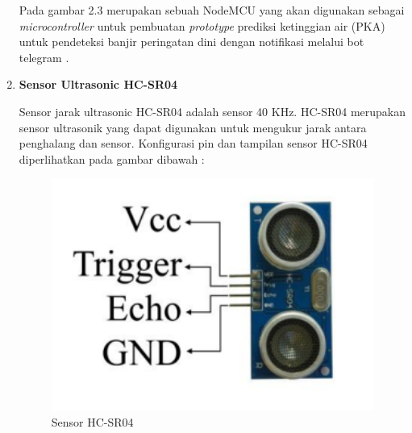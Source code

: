 \begin{enumerate}
\par Pada gambar 2.3 merupakan sebuah NodeMCU yang akan digunakan sebagai \textit{microcontroller} untuk pembuatan \textit{prototype} prediksi ketinggian air (PKA) untuk pendeteksi banjir peringatan dini dengan notifikasi melalui bot telegram .
    
\item \textbf{Sensor Ultrasonic HC-SR04}
\par Sensor jarak ultrasonic HC-SR04 adalah sensor 40 KHz. HC-SR04 merupakan sensor ultrasonik yang dapat digunakan untuk mengukur jarak antara penghalang dan sensor. Konfigurasi pin dan tampilan sensor HC-SR04 diperlihatkan pada gambar dibawah :
\begin{figure}[H]
\centering
\includegraphics[width=1\textwidth]{figures/sensor2.png}
\caption{Sensor HC-SR04}
\label{print}
\end{figure}


\end{enumerate}

